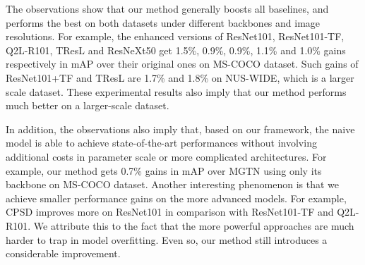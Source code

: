 \documentclass{article}
\begin{document}
The observations show that our method generally boosts all baselines, and performs the best on both datasets under different backbones and image resolutions. For example, the enhanced versions of ResNet101, ResNet101-TF, Q2L-R101, TResL and ResNeXt50 get 1.5\%, 0.9\%, 0.9\%, 1.1\% and 1.0\% gains respectively in mAP over their original ones on MS-COCO dataset. Such gains of ResNet101+TF and TResL are 1.7\% and 1.8\% on NUS-WIDE, which is a larger scale dataset. These experimental results also imply that our method performs much better on a larger-scale dataset.

In addition, the observations also imply that, based on our framework, the naive model is able to achieve state-of-the-art performances without involving additional costs in parameter scale or more complicated architectures. For example, our method gets 0.7\% gains in mAP over MGTN using only its backbone on MS-COCO dataset. Another interesting phenomenon is that we achieve smaller performance gains on the more advanced models. For example, CPSD improves more on ResNet101 in comparison with ResNet101-TF and Q2L-R101. We attribute this to the fact that the more powerful approaches are much harder to trap in model overfitting. Even so, our method still introduces a considerable improvement.


\end{document}
